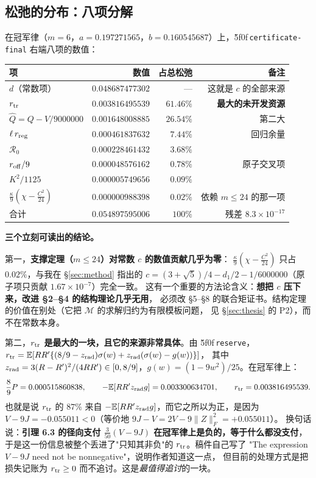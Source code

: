 \documentclass[UTF8,11pt]{ctexart}
\theoremstyle{definition}
\newcommand{\E}{\mathbb{E}}
\newcommand{\peq}[1]{\textup{\u5f0f}\,\texttt{#1}}
\begin{document}
\subsection{松弛的分布：八项分解}

在冠军律（$m=6$，$a=0.197271565$，$b=0.160545687$）上，\peq{certificate-final} 右端八项的数值：
\begin{center}
\small
\begin{tabular}{lrrr}
\toprule
项 & 数值 & 占总松弛 & 备注\\
\midrule
$d$（常数项） & $0.048687477302$ & — & 这就是 $c$ 的全部来源\\
$r_{\rm tr}$ & $0.003816495539$ & $\mathbf{61.46\%}$ & \textbf{最大的未开发资源}\\
$\widehat Q=Q-V/9000000$ & $0.001648008885$ & $\mathbf{26.54\%}$ & 第二大\\
$\ell\,r_{\rm reg}$ & $0.000461837632$ & $7.44\%$ & 回归余量\\
$\mathcal R_0$ & $0.000228461432$ & $3.68\%$ & \\
$r_{\rm off}/9$ & $0.000048576162$ & $0.78\%$ & 原子交叉项\\
$K^2/1125$ & $0.000005749656$ & $0.09\%$ & \\
$\frac\kappa9(\chi-\frac{C^2}{24})$ & $0.000000988398$ & $0.02\%$ & 依赖 $m\le24$ 的那一项\\
\midrule
合计 & $0.054897595006$ & $100\%$ & 残差 $8.3\times10^{-17}$\\
\bottomrule
\end{tabular}
\end{center}

\noindent\textbf{三个立刻可读出的结论。}

第一，\textbf{支撑定理（$m\le24$）对常数 $c$ 的数值贡献几乎为零}：
$\frac\kappa9(\chi-\frac{C^2}{24})$ 只占 $0.02\%$，与我在 \S\ref{sec:method} 指出的
$c=(3+\sqrt5)/4-d_1/2-1/6000000$（原子项只贡献 $1.67\times10^{-7}$）完全一致。
这有一个重要的方法论含义：\textbf{想把 $c$ 压下来，改进 \S2--\S4 的结构理论几乎无用}，
必须改 \S5--\S8 的联合矩证书。结构定理的价值在别处（它把 $\mathcal M$ 的求解归约为有限模板问题，
见 \S\ref{sec:thesis} 的 P2），而不在常数本身。

第二，\textbf{$r_{\rm tr}$ 是最大的一块，且它的来源非常具体}。由 \peq{reserve}，
$r_{\rm tr}=\E[RR'\{(8/9-z_{\rm rad})\sigma(w)+z_{\rm rad}(\sigma(w)-g(w))\}]$，
其中 $z_{\rm rad}=3(R-R')^2/(4RR')\in[0,8/9]$，$g(w)=(1-9w^2)/25$。在冠军律上：
\[
 \frac89P=0.000515860838,\qquad
 -\E[RR'z_{\rm rad}g]=0.003300634701,\qquad
 r_{\rm tr}=0.003816495539 .
\]
也就是说 $r_{\rm tr}$ 的 $87\%$ 来自 $-\E[RR'z_{\rm rad}g]$，而它之所以为正，是因为
$V-9J=-0.055011<0$（等价地 $9J-V=2V-9\|Z\|_F^2=+0.055011$）。
换句话说：\textbf{引理 6.3 的径向支付 $\frac3{50}(V-9J)$ 在冠军律上是负的，等于什么都没支付}，
于是这一份信息被整个丢进了"只知其非负"的 $r_{\rm tr}$。稿件自己写了
"The expression $V-9J$ need not be nonnegative"，说明作者知道这一点，
但目前的处理方式是把损失记账为 $r_{\rm tr}\ge0$ 而不追讨。这是\emph{最值得追讨}的一块。
\end{document}
